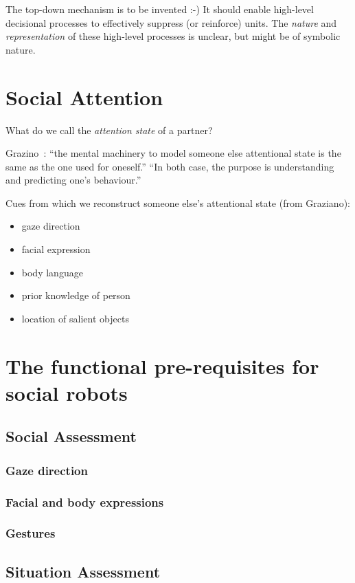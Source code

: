 \documentclass[a4paper]{article}
\begin{document}
The top-down mechanism is to be invented :-)
It should enable high-level decisional processes to effectively suppress (or
reinforce) units. The \emph{nature} and \emph{representation} of these
high-level processes is unclear, but might be of symbolic nature.



\section{Social Attention}

What do we call the \emph{attention state} of a partner?


Grazino~\cite{graziano2013consciousness}: ``the mental machinery to model
someone else attentional state is the same as the one used for oneself.''
``In both case, the purpose is understanding and predicting one's behaviour.''

Cues from which we reconstruct someone else's attentional state (from Graziano):
\begin{itemize}
    \item gaze direction
    \item facial expression
    \item body language
    \item prior knowledge of person
    \item location of salient objects
\end{itemize}


\section{The functional pre-requisites for social robots}

\subsection{Social Assessment}
\subsubsection{Gaze direction}
\subsubsection{Facial and body expressions}
\subsubsection{Gestures}

\subsection{Situation Assessment}
\end{document}
